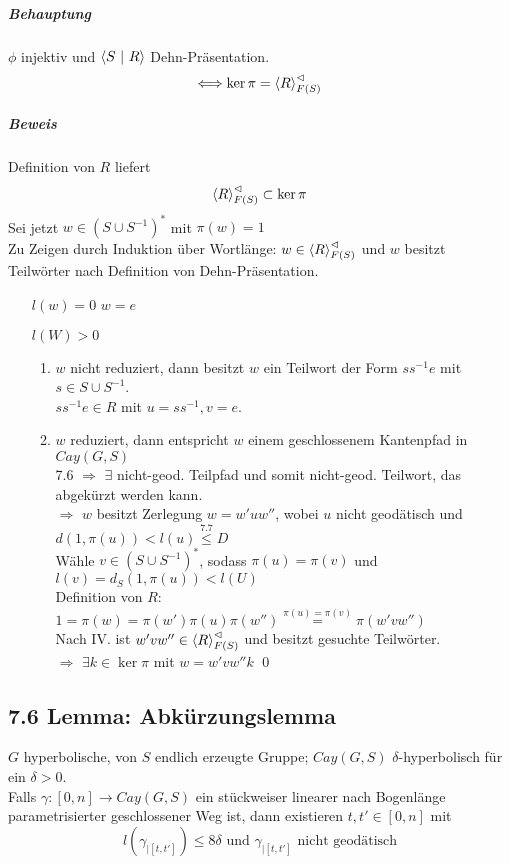 \documentclass{article}
\begin{document}
\subparagraph{Behauptung} $\phi$ injektiv und $\grp{S}{R}$ Dehn-Präsentation.
\[\Longleftrightarrow \ker \pi  = \grp{R}{}_{F(S)}^\vartriangleleft \]
\subparagraph{Beweis}
Definition von $R$ liefert
\[ \grp{R}{}_{F(S)}^\vartriangleleft \subset \ker \pi \]
Sei jetzt $w \in (S\cup S^{-1})^*$ mit $\pi(w) = 1$\\
Zu Zeigen durch Induktion über Wortlänge: $w \in \grp{R}{}_{F(S)}^\vartriangleleft$ und $w$ besitzt Teilwörter nach Definition von Dehn-Präsentation.\\
\begin{enumerate}
	\item[$l(w) = 0$ ] $w = e$
	\item[$l(W) > 0$] 
	\begin{enumerate}
		\item $w$ nicht reduziert, dann besitzt $w$ ein Teilwort der Form $ss^{-1}e$ mit $s \in S\cup S^{-1}$.\\
		$ss^{-1}e \in R$ mit $u = ss^{-1}, v = e$.
		\item $w$ reduziert, dann entspricht $w$ einem geschlossenem Kantenpfad in $Cay(G,S)$\\
		7.6 $\Longrightarrow$ $\exists$ nicht-geod. Teilpfad und somit nicht-geod. Teilwort, das abgekürzt werden kann.\\
		$\Longrightarrow$ $w$ besitzt Zerlegung $w = w'uw''$, wobei $u$ nicht geodätisch und $d(1, \pi(u)) < l(u) \overset{7.7}{\leq} D$\\
		Wähle $v \in (S\cup S^{-1})^*$, sodass $\pi(u) = \pi(v)$ und $l(v) = d_S(1, \pi(u))< l(U)$\\
		Definition von $R$: $1 = \pi(w) = \pi(w') \pi(u) \pi(w'') \overset{\pi(u) = \pi(v)}{=} \pi(w'vw'') $\\
		Nach IV. ist $w'vw'' \in \grp{R}{}_{F(S)}^\vartriangleleft$ und besitzt gesuchte Teilwörter.\\
		$\Longrightarrow$ $\exists k \in \ker \pi $ mit $w = w'vw''k$ \qed
	\end{enumerate}
\end{enumerate}

\subsection{7.6 Lemma: Abkürzungslemma}
$G$ hyperbolische, von $S$ endlich erzeugte Gruppe; $Cay(G,S)$ $\delta$-hyperbolisch für ein $\delta > 0$.\\
Falls $\gamma : [0,n] \rightarrow Cay(G,S)$ ein stückweiser linearer nach Bogenlänge parametrisierter geschlossener Weg ist, dann existieren $t,t'\in [0,n]$ mit 
\[l(\gamma_{|[t,t']}) \leq 8\delta \text{ und } \gamma_{|[t,t']} \text{ nicht geodätisch} \]
\end{document}
